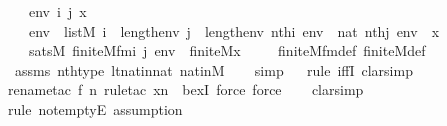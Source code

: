 \begin{isabellebody}
\ \ \ env\ i\ j\ x\isanewline
\ \ \ {\isachardoublequoteopen}env\ {\isasymin}\ list{\isacharparenleft}{\kern0pt}M{\isacharparenright}{\kern0pt}{\isachardoublequoteclose}\ {\isachardoublequoteopen}i\ {\isacharless}{\kern0pt}\ length{\isacharparenleft}{\kern0pt}env{\isacharparenright}{\kern0pt}{\isachardoublequoteclose}\ {\isachardoublequoteopen}j\ {\isacharless}{\kern0pt}\ length{\isacharparenleft}{\kern0pt}env{\isacharparenright}{\kern0pt}{\isachardoublequoteclose}\ {\isachardoublequoteopen}nth{\isacharparenleft}{\kern0pt}i{\isacharcomma}{\kern0pt}\ env{\isacharparenright}{\kern0pt}\ {\isacharequal}{\kern0pt}\ nat{\isachardoublequoteclose}\ {\isachardoublequoteopen}nth{\isacharparenleft}{\kern0pt}j{\isacharcomma}{\kern0pt}\ env{\isacharparenright}{\kern0pt}\ {\isacharequal}{\kern0pt}\ x{\isachardoublequoteclose}\isanewline
\ \ \ {\isachardoublequoteopen}sats{\isacharparenleft}{\kern0pt}M{\isacharcomma}{\kern0pt}\ finite{\isacharunderscore}{\kern0pt}M{\isacharunderscore}{\kern0pt}fm{\isacharparenleft}{\kern0pt}i{\isacharcomma}{\kern0pt}\ j{\isacharparenright}{\kern0pt}{\isacharcomma}{\kern0pt}\ env{\isacharparenright}{\kern0pt}\ {\isasymlongleftrightarrow}\ finite{\isacharunderscore}{\kern0pt}M{\isacharparenleft}{\kern0pt}x{\isacharparenright}{\kern0pt}{\isachardoublequoteclose}\ \isanewline
%
\isadelimproof
\isanewline
\ \ %
\endisadelimproof
%
\isatagproof
{}\isamarkupfalse%
\ finite{\isacharunderscore}{\kern0pt}M{\isacharunderscore}{\kern0pt}fm{\isacharunderscore}{\kern0pt}def\ finite{\isacharunderscore}{\kern0pt}M{\isacharunderscore}{\kern0pt}def\isanewline
\ \ \isamarkupfalse%
\ assms\ nth{\isacharunderscore}{\kern0pt}type\ lt{\isacharunderscore}{\kern0pt}nat{\isacharunderscore}{\kern0pt}in{\isacharunderscore}{\kern0pt}nat\ nat{\isacharunderscore}{\kern0pt}in{\isacharunderscore}{\kern0pt}M\isanewline
\ \ \isamarkupfalse%
\ simp\isanewline
\ \ \isamarkupfalse%
{\isacharparenleft}{\kern0pt}rule\ iffI{\isacharcomma}{\kern0pt}\ clarsimp{\isacharparenright}{\kern0pt}\isanewline
\ \ \ \isamarkupfalse%
{\isacharparenleft}{\kern0pt}rename{\isacharunderscore}{\kern0pt}tac\ f\ n{\isacharcomma}{\kern0pt}\ rule{\isacharunderscore}{\kern0pt}tac\ x{\isacharequal}{\kern0pt}n\ \ bexI{\isacharcomma}{\kern0pt}\ force{\isacharcomma}{\kern0pt}\ force{\isacharparenright}{\kern0pt}\isanewline
\ \ \isamarkupfalse%
\ clarsimp\isanewline
\ \ \isamarkupfalse%
{\isacharparenleft}{\kern0pt}rule\ not{\isacharunderscore}{\kern0pt}emptyE{\isacharcomma}{\kern0pt}\ assumption{\isacharparenright}{\kern0pt}\isanewline

\end{isabellebody}
